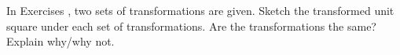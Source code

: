 {\noin In Exercises}
{, two sets of transformations are given. Sketch the transformed unit square under each set of transformations. Are the transformations the same? Explain why/why not.}
